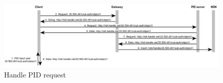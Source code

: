 














\begin{figure}[H]
    \centering
    \includegraphics[width=\textwidth]{Images/pid_seq3.png}
    \caption{Handle PID request\label{fig:seq_pid}}
\end{figure}

